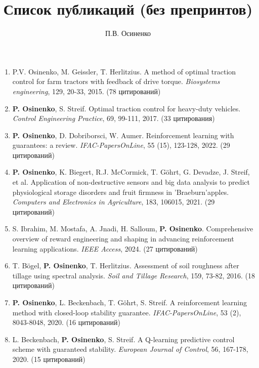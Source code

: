 \documentclass{article}
\begin{document}
\title{Список публикаций (без препринтов)}
\author{П.В. Осиненко}
\date{}
\maketitle

\begin{enumerate}

\item P.V. Osinenko, M. Geissler, T. Herlitzius. A method of optimal traction control for farm tractors with feedback of drive torque. \textit{Biosystems engineering}, 129, 20-33, 2015. (78 цитирований)

\item \textbf{P. Osinenko}, S. Streif. Optimal traction control for heavy-duty vehicles. \textit{Control Engineering Practice}, 69, 99-111, 2017. (33 цитирования)

\item \textbf{P. Osinenko}, D. Dobriborsci, W. Aumer. Reinforcement learning with guarantees: a review. \textit{IFAC-PapersOnLine}, 55 (15), 123-128, 2022. (29 цитирований)

\item \textbf{P. Osinenko}, K. Biegert, R.J. McCormick, T. Göhrt, G. Devadze, J. Streif, et al. Application of non-destructive sensors and big data analysis to predict physiological storage disorders and fruit firmness in 'Braeburn'apples. \textit{Computers and Electronics in Agriculture}, 183, 106015, 2021. (29 цитирований)

\item S. Ibrahim, M. Mostafa, A. Jnadi, H. Salloum, \textbf{P. Osinenko}. Comprehensive overview of reward engineering and shaping in advancing reinforcement learning applications. \textit{IEEE Access}, 2024. (27 цитирований)

\item T. Bögel, \textbf{P. Osinenko}, T. Herlitzius. Assessment of soil roughness after tillage using spectral analysis. \textit{Soil and Tillage Research}, 159, 73-82, 2016. (18 цитирований)

\item \textbf{P. Osinenko}, L. Beckenbach, T. Göhrt, S. Streif. A reinforcement learning method with closed-loop stability guarantee. \textit{IFAC-PapersOnLine}, 53 (2), 8043-8048, 2020. (16 цитирований)

\item L. Beckenbach, \textbf{P. Osinenko}, S. Streif. A Q-learning predictive control scheme with guaranteed stability. \textit{European Journal of Control}, 56, 167-178, 2020. (15 цитирований)


\end{enumerate}
\end{document}
